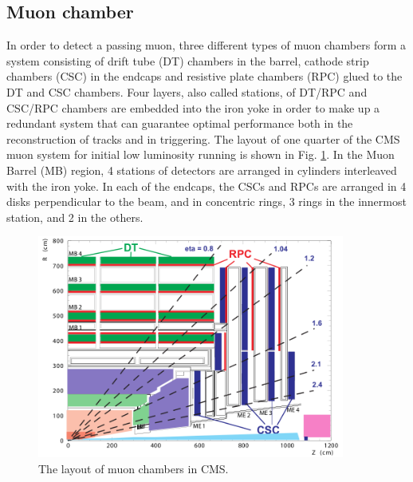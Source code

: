 \subsection{Muon chamber}
In order to detect a passing muon, three different types of muon chambers form a system consisting of drift tube
(DT) chambers in the barrel, cathode strip chambers (CSC) in the endcaps and resistive plate chambers (RPC)
glued to the DT and CSC chambers. Four layers, also called stations, of DT/RPC and CSC/RPC chambers are
embedded into the iron yoke in order to make up a redundant system that can guarantee optimal performance
both in the reconstruction of tracks and in triggering. The layout of one quarter of the CMS muon system for initial low luminosity running is
shown in Fig. \ref{fig:muonchamber}. In the Muon Barrel (MB) region, 4 stations of detectors are arranged in
cylinders interleaved with the iron yoke. In each of the endcaps, the CSCs and RPCs are arranged in 4 disks perpendicular to
the beam, and in concentric rings, 3 rings in the innermost station, and 2 in the others.

\begin{figure}
 \begin{center}
  \includegraphics[width=0.9\textwidth]{plot/muonchamber.png}
 \end{center}
\caption{\label{fig:muonchamber}The layout of muon chambers in CMS.}
\end{figure}

